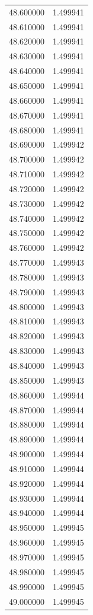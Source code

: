 \begin{tabular}{rr}
48.600000 & 1.499941 \\
48.610000 & 1.499941 \\
48.620000 & 1.499941 \\
48.630000 & 1.499941 \\
48.640000 & 1.499941 \\
48.650000 & 1.499941 \\
48.660000 & 1.499941 \\
48.670000 & 1.499941 \\
48.680000 & 1.499941 \\
48.690000 & 1.499942 \\
48.700000 & 1.499942 \\
48.710000 & 1.499942 \\
48.720000 & 1.499942 \\
48.730000 & 1.499942 \\
48.740000 & 1.499942 \\
48.750000 & 1.499942 \\
48.760000 & 1.499942 \\
48.770000 & 1.499943 \\
48.780000 & 1.499943 \\
48.790000 & 1.499943 \\
48.800000 & 1.499943 \\
48.810000 & 1.499943 \\
48.820000 & 1.499943 \\
48.830000 & 1.499943 \\
48.840000 & 1.499943 \\
48.850000 & 1.499943 \\
48.860000 & 1.499944 \\
48.870000 & 1.499944 \\
48.880000 & 1.499944 \\
48.890000 & 1.499944 \\
48.900000 & 1.499944 \\
48.910000 & 1.499944 \\
48.920000 & 1.499944 \\
48.930000 & 1.499944 \\
48.940000 & 1.499944 \\
48.950000 & 1.499945 \\
48.960000 & 1.499945 \\
48.970000 & 1.499945 \\
48.980000 & 1.499945 \\
48.990000 & 1.499945 \\
49.000000 & 1.499945 \\

\end{tabular}
